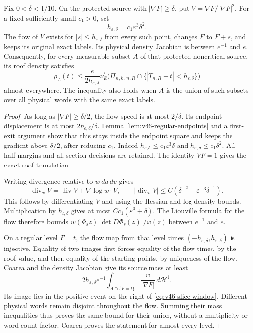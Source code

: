\begin{lemma}
\label{lem:v46-positive-flow-box}
Fix $0<\delta<1/10$. On the protected source with
$|\nabla F|\ge\delta$, put $V=\nabla F/|\nabla F|^2$. For a fixed
sufficiently small $c_1>0$, set
\begin{equation}\label{eq:v46-flow-width}
 h_{\varepsilon,\delta}=c_1\varepsilon^3\delta^2.
\end{equation}
The flow of $V$ exists for $|s|\le h_{\varepsilon,\delta}$ from every
such point, changes $F$ to $F+s$, and keeps its original exact labels.
Its physical density Jacobian is between $e^{-1}$ and $e$.
Consequently, for every measurable subset $A$ of that protected
noncritical source, its roof density satisfies
\begin{equation}\label{eq:v46-slice-window}
 \rho_A(t)\le \frac{e}{2h_{\varepsilon,\delta}}
       \nu_R^*\bigl(\Pi_{n,k,m,R}\cap
                    \{|T_{n,R}-t|<h_{\varepsilon,\delta}\}\bigr)
\end{equation}
almost everywhere. The inequality also holds when $A$ is the union
of such subsets over all physical words with the same exact labels.
\end{lemma}
\begin{proof}
As long as $|\nabla F|\ge\delta/2$, the flow speed is at most
$2/\delta$. Its endpoint displacement is at most
$2h_{\varepsilon,\delta}/\delta$. Lemma~\ref{lem:v46-regular-endpoints}
and a first-exit argument show that this stays inside the endpoint
square and keeps the gradient above $\delta/2$, after reducing $c_1$.
Indeed $h_{\varepsilon,\delta}\le c_1\varepsilon^3\delta$ and
$h_{\varepsilon,\delta}\le c_1\delta^2$. All half-margins and all
section decisions are retained. The identity $VF=1$ gives the exact
roof translation.

Writing divergence relative to $w\,du\,dv$ gives
\[
 \operatorname{div}_w V
   =\operatorname{div}V+\nabla\log w\cdot V,
 \qquad
 |\operatorname{div}_w V|
       \le C(\delta^{-2}+\varepsilon^{-3}\delta^{-1}).
\]
This follows by differentiating $V$ and using the Hessian and
log-density bounds. Multiplication by
$h_{\varepsilon,\delta}$ gives at most
$Cc_1(\varepsilon^3+\delta)$. The Liouville formula for the flow
therefore bounds $w(\Phi_s z)|\det D\Phi_s(z)|/w(z)$ between
$e^{-1}$ and $e$.

On a regular level $F=t$, the flow map from that level times
$(-h_{\varepsilon,\delta},h_{\varepsilon,\delta})$ is injective.
Equality of two images first forces equality of the flow times, by
the roof value, and then equality of the starting points, by uniqueness
of the flow. Coarea and the density Jacobian give its source mass at
least
\[
 2h_{\varepsilon,\delta}e^{-1}
       \int_{A\cap\{F=t\}}\frac{w}{|\nabla F|}\,d\mathcal H^1.
\]
Its image lies in the positive event on the right of
\eqref{eq:v46-slice-window}. Different physical words remain disjoint
throughout the flow. Summing their mass inequalities thus proves the
same bound for their union, without a multiplicity or word-count
factor. Coarea proves the statement for almost every level.
\end{proof}

